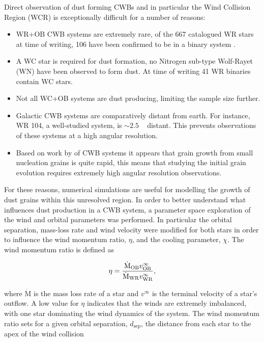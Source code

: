 
Direct observation of dust forming CWBs and in particular the Wind Collision Region (WCR) is exceptionally difficult for a number of reasons:

\begin{itemize}
  \item WR+OB CWB systems are extremely rare, of the 667 catalogued WR stars at time of writing, 106 have been confirmed to be in a binary system \parencite{rossloweSpatialDistributionGalactic2015}.
  \item A WC star is required for dust formation, no Nitrogen sub-type Wolf-Rayet (WN) have been observed to form dust. At time of writing 41 WR binaries contain WC stars.
  \item Not all WC+OB systems are dust producing, limiting the sample size further.
  \item Galactic CWB systems are comparatively distant from earth. For instance, WR 104, a well-studied system, is $\sim 2.5$ \si{\kilo\parsec} distant. This prevents observations of these systems at a high angular resolution.
  \item Based on work by \textcite{zubkoPhysicalModelDust1998a} of CWB systems it appears that grain growth from small nucleation grains is quite rapid, this means that studying the initial grain evolution requires extremely high angular resolution observations.
\end{itemize}

For these reasons, numerical simulations are useful for modelling the growth of dust grains within this unresolved region.
In order to better understand what influences dust production in a CWB system, a parameter space exploration of the wind and orbital parameters was performed.
In particular the orbital separation, mass-loss rate and wind velocity were modified for both stars in order to influence the wind momentum ratio, $\eta$, and the cooling parameter, $\chi$.
The wind momentum ratio is defined as

\begin{equation}
  \eta = \frac{\dot{\text M}_\text{OB} v^\infty_\text{OB}}{\dot{\text M}_\text{WR}v^\infty_\text{WR}} ,
\end{equation}

\noindent
where $\dot{\text{M}}$ is the mass loss rate of a star and $v^\infty$ is the terminal velocity of a star's outflow.
A low value for $\eta$ indicates that the winds are extremely imbalanced, with one star dominating the wind dynamics of the system.
The wind momentum ratio sets for a given orbital separation, $d_\text{sep}$, the distance from each star to the apex of the wind collision


